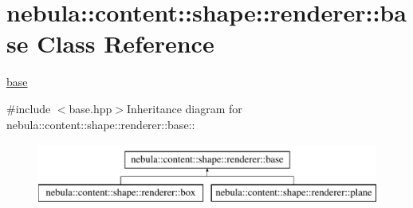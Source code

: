 \hypertarget{classnebula_1_1content_1_1shape_1_1renderer_1_1base}{
\section{nebula::content::shape::renderer::base Class Reference}
\label{classnebula_1_1content_1_1shape_1_1renderer_1_1base}
}


\hyperlink{classnebula_1_1content_1_1shape_1_1renderer_1_1base}{base}  


{\ttfamily \#include $<$base.hpp$>$}Inheritance diagram for nebula::content::shape::renderer::base::\begin{figure}[H]
\begin{center}
\leavevmode
\includegraphics[height=2cm]{classnebula_1_1content_1_1shape_1_1renderer_1_1base}
\end{center}
\end{figure}
